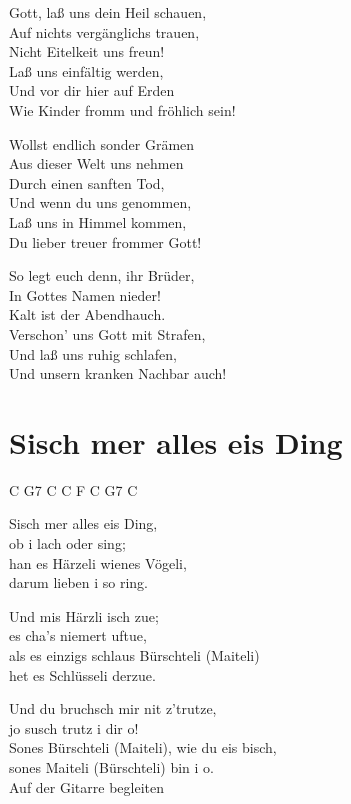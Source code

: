\documentclass[
  letterpaper,
  a5paper]{memoir}
\begin{document}
Gott, laß uns dein Heil schauen,\\
Auf nichts vergänglichs trauen,\\
Nicht Eitelkeit uns freun!\\
Laß uns einfältig werden,\\
Und vor dir hier auf Erden\\
Wie Kinder fromm und fröhlich sein!

Wollst endlich sonder Grämen\\
Aus dieser Welt uns nehmen\\
Durch einen sanften Tod,\\
Und wenn du uns genommen,\\
Laß uns in Himmel kommen,\\
Du lieber treuer frommer Gott!

So legt euch denn, ihr Brüder,\\
In Gottes Namen nieder!\\
Kalt ist der Abendhauch.\\
Verschon' uns Gott mit Strafen,\\
Und laß uns ruhig schlafen,\\
Und unsern kranken Nachbar auch!

\hypertarget{sisch-mer-alles-eis-ding}{%
\chapter{S\textquotesingle isch mer alles eis
Ding}\label{sisch-mer-alles-eis-ding}}

C G7 C C F C G7 C

S\textquotesingle isch mer alles eis Ding,\\
ob i lach oder sing;\\
han es Härzeli wienes Vögeli,\\
darum lieben i so ring.

Und mis Härzli isch zue;\\
es cha's niemert uftue,\\
als es einzigs schlaus Bürschteli (Maiteli)\\
het es Schlüsseli derzue.

Und du bruchsch mir nit z'trutze,\\
jo susch trutz i dir o!\\
Sones Bürschteli (Maiteli), wie du eis bisch,\\
sones Maiteli (Bürschteli) bin i o.\\
Auf der Gitarre begleiten
\end{document}
